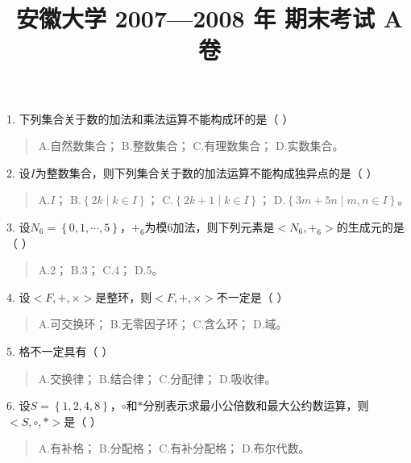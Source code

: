 \documentclass[fontset=exam]{exam-zh}
\title{安徽大学 2007—2008 年 期末考试 A 卷}
\begin{document}
\maketitle
{}
\noindent{}\par
{}

\par{}\smallskip

1. 下列集合关于数的加法和乘法运算不能构成环的是（ ）

\begin{quote}
A.自然数集合； B.整数集合； C.有理数集合； D.实数集合。
\end{quote}

2. 设\(I\)为整数集合，则下列集合关于数的加法运算不能构成独异点的是（ ）

\begin{quote}
A.\(I\)； B.\(\left\{ 2k \middle| k \in I \right\}\)； C.\(\left\{ 2k + 1 \middle| k \in I \right\}\)； D.\(\left\{ 3m + 5n \middle| m,n \in I \right\}\)。
\end{quote}

3. 设\(N_{6} = \left\{ 0,1,\cdots,5 \right\}\)，\(+_{6}\)为模\(6\)加法，则下列元素是\(< N_{6}, +_{6} >\)的生成元的是（ ）

\begin{quote}
A.2； B.3； C.4； D.5。
\end{quote}

4. 设\(< F, + , \times >\)是整环，则\(< F, + , \times >\)不一定是（ ）

\begin{quote}
A.可交换环； B.无零因子环； C.含么环； D.域。
\end{quote}

5. 格不一定具有（ ）

\begin{quote}
A.交换律； B.结合律； C.分配律； D.吸收律。
\end{quote}

6. 设\(S = \left\{ 1,2,4,8 \right\}\)，\(\circ\)和\(\ast\)分别表示求最小公倍数和最大公约数运算，则\(< S, \circ , \ast >\)是（ ）

\begin{quote}
A.有补格； B.分配格； C.有补分配格； D.布尔代数。
\end{quote}
\end{document}

